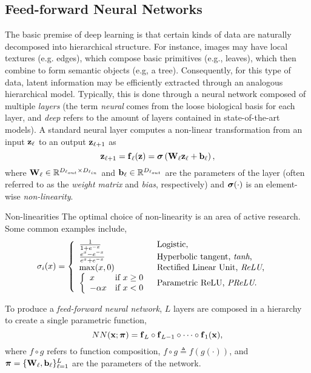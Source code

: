 \subsection{Feed-forward Neural Networks} 
The basic premise of deep learning is that certain kinds of data are naturally decomposed into hierarchical structure. For instance, images may have local textures (e.g. edges), which compose basic primitives (e.g., leaves), which then combine to form semantic objects (e.g, a tree). Consequently, for this type of data, latent information may be efficiently extracted through an analogous hierarchical model.  Typically, this is done through a neural network composed of multiple \textit{layers} (the term \textit{neural} comes from the loose biological basis for each layer, and \textit{deep} refers to the amount of layers contained in state-of-the-art models). A standard neural layer computes a non-linear transformation from an input $\boldsymbol{\mathbf{z}}_\ell$ to an output $\boldsymbol{\mathbf{z}}_{\ell+1}$ as  
\begin{equation}
\boldsymbol{\mathbf{z}}_{\ell+1} = \boldsymbol{\mathbf{f}}_\ell(\boldsymbol{\mathbf{z}}) = \boldsymbol{\mathbf{\sigma}}\left(\boldsymbol{\mathbf{W}}_\ell\boldsymbol{\mathbf{z}}_\ell + \boldsymbol{\mathbf{b}}_\ell\right),
\end{equation}
where $\boldsymbol{\mathbf{W}}_\ell \in \mathbb{R}^{D_{\ell_{out}} \times D_{\ell_{in}}}$ and $\boldsymbol{\mathbf{b}}_\ell \in \mathbb{R}^{D_{\ell_{out}}}$ are the parameters of the layer (often referred to as the \textit{weight matrix} and \textit{bias}, respectively) and $\boldsymbol{\mathbf{\sigma}}(\cdot)$ is an element-wise \textit{non-linearity}.

\begin{remark}{Non-linearities}
	The optimal choice of non-linearity is an area of active research. Some common examples include,
	\begin{align}
\sigma_i(x) &= \left\{  	\begin{array}{ll}
		 \frac{1}{1+e^{-x}}   & \mbox{Logistic,} \\
		 \frac{e^x - e^{-x}}{e^x + e^{-x}}  & \mbox{Hyperbolic tangent, \textit{tanh},} \\
		 \max(x, 0)  & \mbox{Rectified Linear Unit, \textit{ReLU},} \\
		\left\{  	\begin{array}{ll}  x & \mbox{if} ~x \geq 0 \\
										-\alpha x & \mbox{if} ~ x < 0 \end{array}
		\right.   & \mbox{Parametric ReLU, \textit{PReLU}.} \end{array}\right.
\end{align}
\end{remark}
To produce a \textit{feed-forward neural network}, $L$ layers are composed in a hierarchy to create a single parametric function,
\begin{equation}
 NN(\boldsymbol{\mathbf{x}}; \boldsymbol{\mathbf{\pi}}) = \boldsymbol{\mathbf{f}}_L \circ \boldsymbol{\mathbf{f}}_{L-1} \circ \cdots \circ \boldsymbol{\mathbf{f}}_{1}(\boldsymbol{\mathbf{x}}),
\end{equation}
where $f \circ g$ refers to function composition, $f \circ g \triangleq f (g(\cdot))$, and $\boldsymbol{\mathbf{\pi}} = \{\boldsymbol{\mathbf{W}}_\ell, \boldsymbol{\mathbf{b}}_\ell\}_{\ell=1}^L$ are the parameters of the network.


